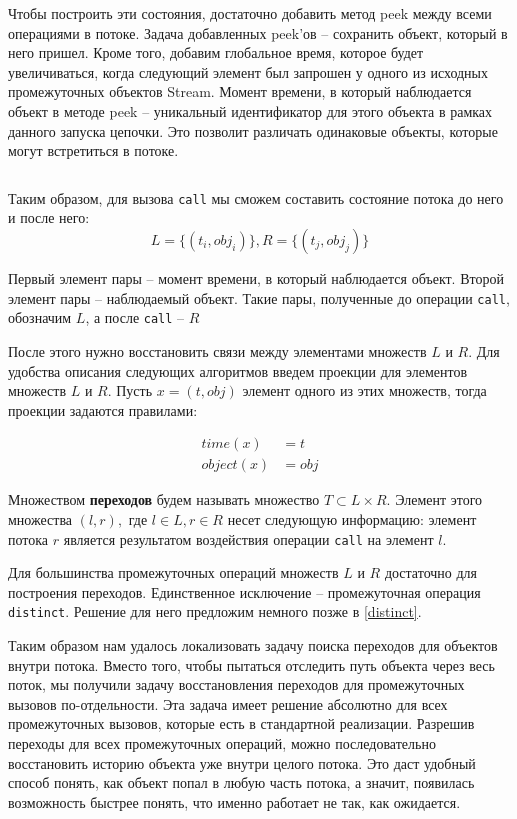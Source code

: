 Чтобы построить эти состояния, достаточно добавить метод peek между всеми операциями в потоке. Задача добавленных peek'ов -- сохранить объект, который в него пришел. Кроме того, добавим глобальное время, которое будет увеличиваться, когда следующий элемент был запрошен у одного из исходных промежуточных объектов Stream. Момент времени, в который наблюдается объект в методе peek -- уникальный идентификатор для этого объекта в рамках данного запуска цепочки. Это позволит различать одинаковые объекты, которые могут встретиться в потоке.

\inputminted{java}{chapter2/code/LocalChainModification.java}

Таким образом, для вызова \texttt{call} мы сможем составить состояние потока до него и после него:
\begin{equation*}
	L = \{(t_i, obj_i)\}, R = \{(t_j, obj_j)\}
\end{equation*}

Первый элемент пары -- момент времени, в который наблюдается объект. Второй элемент пары -- наблюдаемый объект. Такие пары, полученные до операции \texttt{call}, обозначим $L$, а после \texttt{call} -- $R$

После этого нужно восстановить связи между элементами множеств $L$ и $R$. Для удобства описания следующих алгоритмов введем проекции для элементов множеств $L$ и $R$. Пусть $x = (t, obj)$ элемент одного из этих множеств, тогда проекции задаются правилами:

\begin{align*}
	time(x) &= t \\
	object(x) &= obj
\end{align*}

Множеством \textbf{переходов} будем называть множество $T \subset L \times R$. Элемент этого множества $(l, r), $ где $l \in L, r \in R$ несет следующую информацию: элемент потока $r$ является результатом воздействия операции \texttt{call} на элемент $l$.

Для большинства промежуточных операций множеств $L$ и $R$ достаточно для построения переходов. Единственное исключение -- промежуточная операция \texttt{distinct}. Решение для него предложим немного позже в \ref{distinct}.

Таким образом нам удалось локализовать задачу поиска переходов для объектов внутри потока. Вместо того, чтобы пытаться отследить путь объекта через весь поток, мы получили задачу восстановления переходов для промежуточных вызовов по-отдельности. Эта задача имеет решение абсолютно для всех промежуточных вызовов, которые есть в стандартной реализации. Разрешив переходы для всех промежуточных операций, можно последовательно восстановить историю объекта уже внутри целого потока. Это даст удобный способ понять, как объект попал в любую часть потока, а значит, появилась возможность быстрее понять, что именно работает не так, как ожидается.
